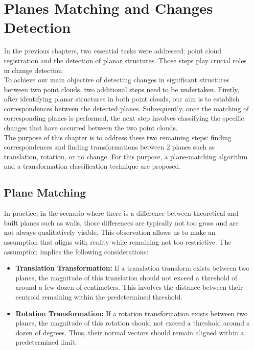 \chapter{Planes Matching and Changes Detection}

In the previous chapters, two essential tasks were addressed: point cloud registration and the detection of planar structures. Those steps play crucial roles in change detection.\\

To achieve our main objective of detecting changes in significant structures between two point clouds, two additional steps need to be undertaken. Firstly, after identifying planar structures in both point clouds, our aim is to establish correspondences between the detected planes. Subsequently, once the matching of corresponding planes is performed, the next step involves classifying the specific changes that have occurred between the two point clouds.\\

The purpose of this chapter is to address these two remaining steps: finding correspondences and finding transformations between 2 planes such as translation, rotation, or no change. For this purpose, a plane-matching algorithm and a transformation classification technique are proposed.

\section{Plane Matching}
In practice, in the scenario where there is a difference between theoretical and built planes such as walls, those differences are typically not too gross and are not always qualitatively visible. This observation allows us to make an assumption that aligns with reality while remaining not too restrictive. The assumption implies the following considerations:
\begin{itemize}
    \item \textbf{Translation Transformation:} If a translation transform exists between two planes, the magnitude of this translation should not exceed a threshold of around a few dozen of centimeters. This involves the distance between their centroid remaining within the predetermined threshold.
    \item \textbf{Rotation Transformation: } If a rotation transformation exists between two planes, the magnitude of this rotation should not exceed a threshold around a dozen of degrees. Thus, their normal vectors should remain aligned within a predetermined limit.
\end{itemize}

